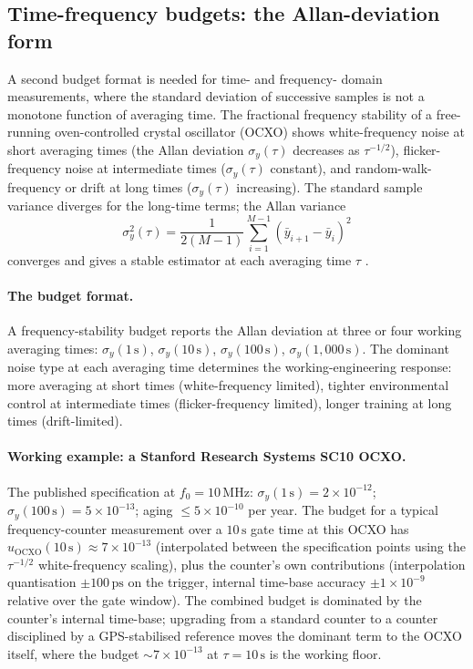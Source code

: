 \subsection{Time-frequency budgets: the Allan-deviation form}

A second budget format is needed for time- and frequency-
domain measurements, where the standard deviation of
successive samples is not a monotone function of averaging
time. The fractional frequency stability of a free-running
oven-controlled crystal oscillator (OCXO) shows
white-frequency noise at short averaging times (the Allan
deviation $\sigma_{y}(\tau)$ decreases as $\tau^{-1/2}$),
flicker-frequency noise at intermediate times ($\sigma_{y}(\tau)$
constant), and random-walk-frequency or drift at long times
($\sigma_{y}(\tau)$ increasing). The standard sample variance
diverges for the long-time terms; the Allan variance
\[
\sigma_{y}^{2}(\tau) = \frac{1}{2(M - 1)} \sum_{i=1}^{M-1}
(\bar{y}_{i+1} - \bar{y}_{i})^{2}
\]
converges and gives a stable estimator at each averaging
time $\tau$ \cite{paper:ch04t3-allan-1966}.

\paragraph{The budget format.} A frequency-stability budget
reports the Allan deviation at three or four working
averaging times: $\sigma_{y}(1\,\si{\second})$,
$\sigma_{y}(10\,\si{\second})$, $\sigma_{y}(100\,\si{\second})$,
$\sigma_{y}(1{,}000\,\si{\second})$. The dominant noise type
at each averaging time determines the working-engineering
response: more averaging at short times (white-frequency
limited), tighter environmental control at intermediate
times (flicker-frequency limited), longer training at long
times (drift-limited).

\paragraph{Working example: a Stanford Research Systems SC10
OCXO.} The published specification at $f_{0} = 10\,\si{\mega
\hertz}$: $\sigma_{y}(1\,\si{\second}) = 2 \times 10^{-12}$;
$\sigma_{y}(100\,\si{\second}) = 5 \times 10^{-13}$; aging
$\leq 5 \times 10^{-10}$ per year. The budget for a typical
frequency-counter measurement over a $10\,\si{\second}$ gate
time at this OCXO has $u_{\text{OCXO}}(10\,\si{\second})
\approx 7 \times 10^{-13}$ (interpolated between the
specification points using the $\tau^{-1/2}$ white-frequency
scaling), plus the counter's own contributions (interpolation
quantisation $\pm 100\,\si{\pico\second}$ on the trigger,
internal time-base accuracy $\pm 1 \times 10^{-9}$ relative
over the gate window). The combined budget is dominated by
the counter's internal time-base; upgrading from a standard
counter to a counter disciplined by a GPS-stabilised reference
moves the dominant term to the OCXO itself, where the budget
$\sim 7 \times 10^{-13}$ at $\tau = 10\,\si{\second}$ is the
working floor.

